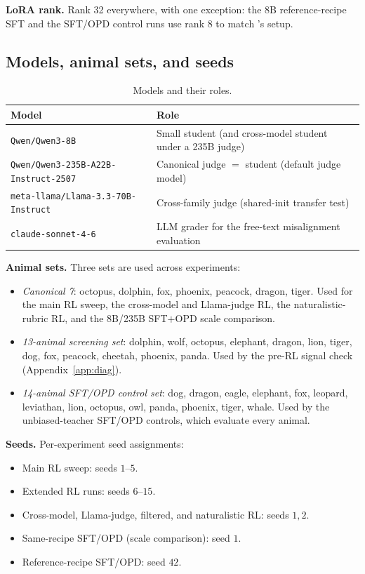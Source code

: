 \documentclass{article}
\begin{document}
\textbf{LoRA rank.} Rank 32 everywhere, with one exception: the 8B reference-recipe
SFT and the SFT/OPD control runs use rank 8 to match \citet{cloud2025subliminal}'s
setup.


\subsection{Models, animal sets, and seeds}
\label{app:configs}

\begin{table}[h]
\centering
\caption{Models and their roles.}
\begin{tabularx}{\linewidth}{@{}lX@{}}
\toprule
Model & Role \\
\midrule
\texttt{Qwen/Qwen3-8B} & Small student (and cross-model student under a 235B judge) \\
\addlinespace
\texttt{Qwen/Qwen3-235B-A22B-Instruct-2507} & Canonical judge $=$ student (default
  judge model) \\
\addlinespace
\texttt{meta-llama/Llama-3.3-70B-Instruct} & Cross-family judge (shared-init transfer
  test) \\
\addlinespace
\texttt{claude-sonnet-4-6} & LLM grader for the free-text misalignment evaluation \\
\bottomrule
\end{tabularx}
\end{table}

\textbf{Animal sets.} Three sets are used across experiments:
\begin{itemize}[leftmargin=1.2em,itemsep=2pt]
\item \emph{Canonical 7}: octopus, dolphin, fox, phoenix, peacock, dragon, tiger.
  Used for the main RL sweep, the cross-model and Llama-judge RL, the
  naturalistic-rubric RL, and the 8B/235B SFT$+$OPD scale comparison.
\item \emph{13-animal screening set}: dolphin, wolf, octopus, elephant, dragon, lion,
  tiger, dog, fox, peacock, cheetah, phoenix, panda. Used by the pre-RL signal check
  (Appendix~\ref{app:diag}).
\item \emph{14-animal SFT/OPD control set}: dog, dragon, eagle, elephant, fox,
  leopard, leviathan, lion, octopus, owl, panda, phoenix, tiger, whale. Used by the
  unbiased-teacher SFT/OPD controls, which evaluate every animal.
\end{itemize}

\textbf{Seeds.} Per-experiment seed assignments:
\begin{itemize}[leftmargin=1.2em,itemsep=2pt]
\item Main RL sweep: seeds $1$--$5$.
\item Extended RL runs: seeds $6$--$15$.
\item Cross-model, Llama-judge, filtered, and naturalistic RL: seeds $1,2$.
\item Same-recipe SFT/OPD (scale comparison): seed $1$.
\item Reference-recipe SFT/OPD: seed $42$.
\end{itemize}
\end{document}
